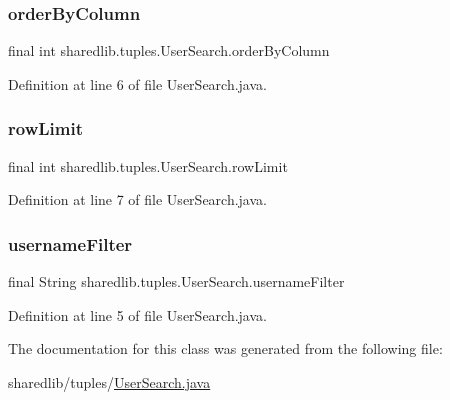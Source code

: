 \hypertarget{classsharedlib_1_1tuples_1_1_user_search_ad7933aec1eaf9be1189cf31556ab2b4e}{}\label{classsharedlib_1_1tuples_1_1_user_search_ad7933aec1eaf9be1189cf31556ab2b4e} 
\subsubsection{\texorpdfstring{order\+By\+Column}{orderByColumn}}
{\footnotesize\ttfamily final int sharedlib.\+tuples.\+User\+Search.\+order\+By\+Column}



Definition at line 6 of file User\+Search.\+java.

\hypertarget{classsharedlib_1_1tuples_1_1_user_search_a70bc74b387d21e5d447e0e8c6c451dc8}{}\label{classsharedlib_1_1tuples_1_1_user_search_a70bc74b387d21e5d447e0e8c6c451dc8} 
\subsubsection{\texorpdfstring{row\+Limit}{rowLimit}}
{\footnotesize\ttfamily final int sharedlib.\+tuples.\+User\+Search.\+row\+Limit}



Definition at line 7 of file User\+Search.\+java.

\hypertarget{classsharedlib_1_1tuples_1_1_user_search_a5680617540c8e1d8901b232717912d65}{}\label{classsharedlib_1_1tuples_1_1_user_search_a5680617540c8e1d8901b232717912d65} 
\subsubsection{\texorpdfstring{username\+Filter}{usernameFilter}}
{\footnotesize\ttfamily final String sharedlib.\+tuples.\+User\+Search.\+username\+Filter}



Definition at line 5 of file User\+Search.\+java.



The documentation for this class was generated from the following file\+:\begin{DoxyCompactItemize}
\item 
sharedlib/tuples/\hyperlink{_user_search_8java}{User\+Search.\+java}\end{DoxyCompactItemize}

